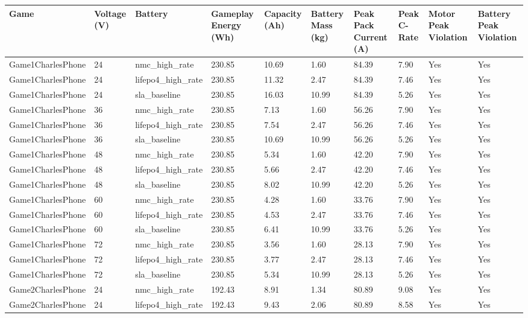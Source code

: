 \begin{longtable}{llllllllll}
\toprule
Game & Voltage (V) & Battery & Gameplay Energy (Wh) & Capacity (Ah) & Battery Mass (kg) & Peak Pack Current (A) & Peak C-Rate & Motor Peak Violation & Battery Peak Violation \\
\midrule
Game1CharlesPhone & 24 & nmc\_high\_rate & 230.85 & 10.69 & 1.60 & 84.39 & 7.90 & Yes & Yes \\
Game1CharlesPhone & 24 & lifepo4\_high\_rate & 230.85 & 11.32 & 2.47 & 84.39 & 7.46 & Yes & Yes \\
Game1CharlesPhone & 24 & sla\_baseline & 230.85 & 16.03 & 10.99 & 84.39 & 5.26 & Yes & Yes \\
Game1CharlesPhone & 36 & nmc\_high\_rate & 230.85 & 7.13 & 1.60 & 56.26 & 7.90 & Yes & Yes \\
Game1CharlesPhone & 36 & lifepo4\_high\_rate & 230.85 & 7.54 & 2.47 & 56.26 & 7.46 & Yes & Yes \\
Game1CharlesPhone & 36 & sla\_baseline & 230.85 & 10.69 & 10.99 & 56.26 & 5.26 & Yes & Yes \\
Game1CharlesPhone & 48 & nmc\_high\_rate & 230.85 & 5.34 & 1.60 & 42.20 & 7.90 & Yes & Yes \\
Game1CharlesPhone & 48 & lifepo4\_high\_rate & 230.85 & 5.66 & 2.47 & 42.20 & 7.46 & Yes & Yes \\
Game1CharlesPhone & 48 & sla\_baseline & 230.85 & 8.02 & 10.99 & 42.20 & 5.26 & Yes & Yes \\
Game1CharlesPhone & 60 & nmc\_high\_rate & 230.85 & 4.28 & 1.60 & 33.76 & 7.90 & Yes & Yes \\
Game1CharlesPhone & 60 & lifepo4\_high\_rate & 230.85 & 4.53 & 2.47 & 33.76 & 7.46 & Yes & Yes \\
Game1CharlesPhone & 60 & sla\_baseline & 230.85 & 6.41 & 10.99 & 33.76 & 5.26 & Yes & Yes \\
Game1CharlesPhone & 72 & nmc\_high\_rate & 230.85 & 3.56 & 1.60 & 28.13 & 7.90 & Yes & Yes \\
Game1CharlesPhone & 72 & lifepo4\_high\_rate & 230.85 & 3.77 & 2.47 & 28.13 & 7.46 & Yes & Yes \\
Game1CharlesPhone & 72 & sla\_baseline & 230.85 & 5.34 & 10.99 & 28.13 & 5.26 & Yes & Yes \\
Game2CharlesPhone & 24 & nmc\_high\_rate & 192.43 & 8.91 & 1.34 & 80.89 & 9.08 & Yes & Yes \\
Game2CharlesPhone & 24 & lifepo4\_high\_rate & 192.43 & 9.43 & 2.06 & 80.89 & 8.58 & Yes & Yes \\

\end{longtable}
